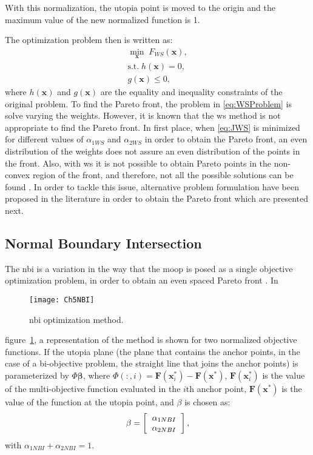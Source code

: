 With this normalization, the utopia point is moved to the origin and the maximum value of the new normalized function is 1.

The optimization problem then is written as:
\begin{equation}
\begin{gathered}
\min_{\mathbf{x}}{\; F_{WS}(\mathbf{x})}, \\
\text{s.t.} \; h(\mathbf{x})=0, \\
g(\mathbf{x}) \leq 0,
\end{gathered}
\label{eq:WSProblem}
\end{equation}
%
where $h(\mathbf{x})$ and $g(\mathbf{x})$ are the equality and inequality constraints of the original problem. To find the Pareto front, the problem in \eqref{eq:WSProblem} is solve varying the weights. However, it is known that the \gls{ws} method is not appropriate to find the Pareto front. In first place, when \eqref{eq:JWS} is minimized for different values of $\alpha_{1WS}$ and $\alpha_{2WS}$ in order to obtain the Pareto front, an even distribution of the weights does not assure an even distribution of the points in the front. Also, with \gls{ws} it is not possible to obtain Pareto points in the non-convex region of the front, and therefore, not all the possible solutions can be found \cite{Das1997}. In order to tackle this issue, alternative problem formulation have been proposed in the literature in order to obtain the Pareto front which are presented next.
\subsection{Normal Boundary Intersection}
\label{sec:NBI}
%
The \gls{nbi} is a variation in the way that the \gls{moop} is posed as a single objective optimization problem, in order to obtain an even spaced Pareto front \cite{Das1998}. In %
%
\begin{figure}%
	\centering
	\texttt{[image: Ch5NBI]}%
	\caption{\gls{nbi} optimization method.}%
	\label{fig:NBI}%
\end{figure}
%
figure~\ref{fig:NBI}, a representation of the method is shown for two normalized objective functions. If the utopia plane (the plane that contains the anchor points, in the case of a bi-objective problem, the straight line that joins the anchor points) is parameterized by $\Phi\mathbf{\beta}$, where $\Phi(:,i)=\mathbf{F}(\mathbf{x}_i^*)-\mathbf{F}(\mathbf{x}^*)$, $\mathbf{F}(\mathbf{x}_i^*)$ is the value of the multi-objective function evaluated in the $i$th anchor point, $\mathbf{F}(\mathbf{x}^*)$ is the value of the function at the utopia point, and $\beta$ is chosen as:
\begin{equation}
\beta=
\left[\begin{tabular}{c}
$\alpha_{1NBI}$ \\ $\alpha_{2NBI}$
\end{tabular}\right],
\label{eq:Beta}
\end{equation}
with $\alpha_{1NBI}+\alpha_{2NBI}=1$.

